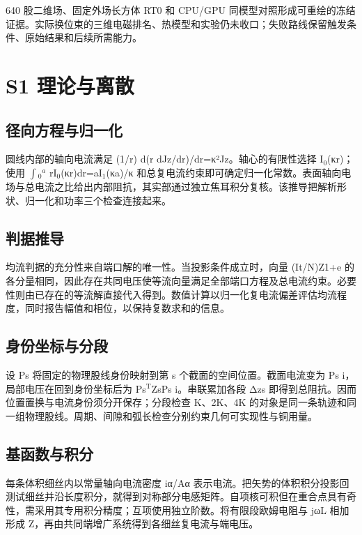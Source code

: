 \documentclass[11pt]{article}
\begin{document}
640 股二维场、固定外场长方体 RT0 和 CPU/GPU 同模型对照形成可重绘的冻结证据。实际换位束的三维电磁排名、热模型和实验仍未收口；失败路线保留触发条件、原始结果和后续所需能力。


\FloatBarrier
\section*{S1 理论与离散}
\hypertarget{chapter-S1}{}
\subsection*{径向方程与归一化}
\hypertarget{S1.round_derivation.heading}{}
圆线内部的轴向电流满足 (1/r) d(r dJz/dr)/dr=κ²Jz。轴心的有限性选择 I\(_0\)(κr)；使用 \(\int\)\(_0\)\(^a\) rI\(_0\)(κr)dr=aI\(_1\)(κa)/κ 和总复电流约束即可确定归一化常数。表面轴向电场与总电流之比给出内部阻抗，其实部通过独立焦耳积分复核。该推导把解析形状、归一化和功率三个检查连接起来。


\subsection*{判据推导}
\hypertarget{S1.sharing_derivation.heading}{}
均流判据的充分性来自端口解的唯一性。当投影条件成立时，向量 (It/N)Z1+e 的各分量相同，因此存在共同电压使等流向量满足全部端口方程及总电流约束。必要性则由已存在的等流解直接代入得到。数值计算以归一化复电流偏差评估均流程度，同时报告幅值和相位，以保持复数求和的信息。


\subsection*{身份坐标与分段}
\hypertarget{S1.dtm_derivation.heading}{}
设 Ps 将固定的物理股线身份映射到第 s 个截面的空间位置。截面电流变为 Ps i，局部电压在回到身份坐标后为 Ps\(^{\mathrm T}\)ZsPs i。串联累加各段 Δzs 即得到总阻抗。因而位置置换与电流身份须分开保存；分段检查 K、2K、4K 的对象是同一条轨迹和同一组物理股线。周期、间隙和弧长检查分别约束几何可实现性与铜用量。


\subsection*{基函数与积分}
\hypertarget{S1.peec_derivation.heading}{}
每条体积细丝内以常量轴向电流密度 iα/Aα 表示电流。把矢势的体积积分投影回测试细丝并沿长度积分，就得到对称部分电感矩阵。自项核可积但在重合点具有奇性，需采用其专用积分精度；互项使用独立阶数。将有限段欧姆电阻与 jωL 相加形成 Z，再由共同端增广系统得到各细丝复电流与端电压。
\end{document}
